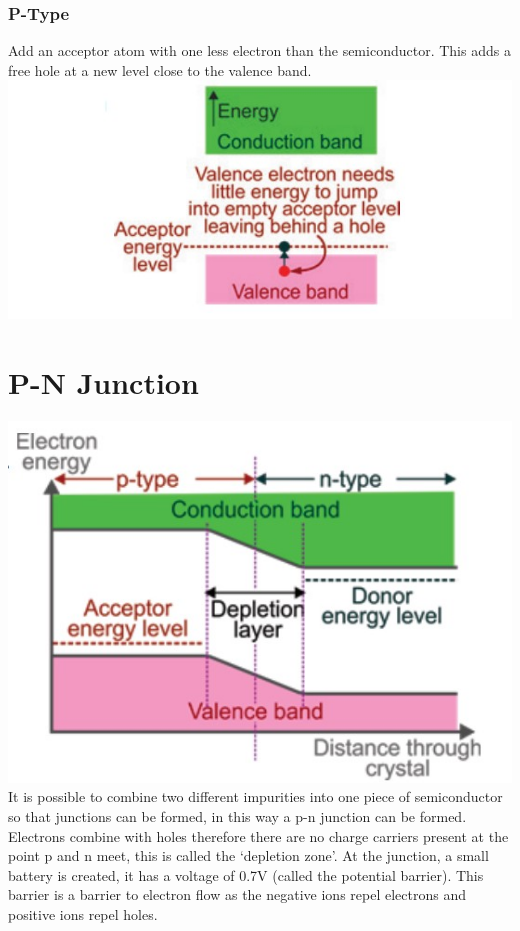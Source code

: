 \documentclass[a4paper,11pt, twocolumn]{article}
\begin{document}
\subsubsection{P-Type}
Add an acceptor atom with one less electron than the semiconductor. This adds a free hole at a new level close to the valence band.
\includegraphics[width=\linewidth]{impureP.jpg}

\section{P-N Junction}
\includegraphics[width=\linewidth]{energyPN.jpg}
It is possible to combine two different impurities into one piece of semiconductor so that junctions can be formed, in this way a p-n junction can be formed. Electrons combine with holes therefore there are no charge carriers present at the point p and n meet, this is called the `depletion zone'. At the junction, a small battery is created, it has a voltage of 0.7V (called the potential barrier). This barrier is a barrier to electron flow as the negative ions repel electrons and positive ions repel holes.
\end{document}
